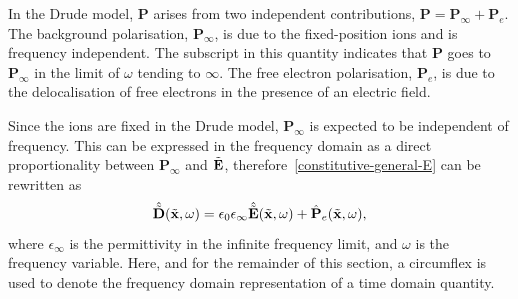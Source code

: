 In the Drude model, $\mathbf{P}$ arises from two independent contributions, $\mathbf{P} = \mathbf{P}_{\infty} + \mathbf{P}_e$. The background polarisation, $\mathbf{P}_{\infty}$, is due to the fixed-position ions and is frequency independent. The subscript in this quantity indicates that $\mathbf{P}$ goes to $\mathbf{P}_{\infty}$ in the limit of $\omega$ tending to $\infty$. The free electron polarisation, $\mathbf{P}_e$, is due to the delocalisation of free electrons in the presence of an electric field.

Since the ions are fixed in the Drude model, $\mathbf{P}_{\infty}$ is expected to be independent of frequency. This can be expressed in the frequency domain as a direct proportionality between $\mathbf{P}_{\infty}$ and $\tilde{\mathbf{E}}$, therefore~\eqref{constitutive-general-E} can be rewritten as
%
\begin{equation}
\label{eq:constitutive_equations_drude_model}
\hat{\tilde{\mathbf{D}}}(\tilde{\mathbf{x}},\omega) = \epsilon_0 \epsilon_{\infty}  \hat{\tilde{\mathbf{E}}}(\tilde{\mathbf{x}}, \omega) + \hat{\mathbf{P}}_e(\tilde{\mathbf{x}},\omega) ,
\end{equation}
%
where $\epsilon_{\infty}$ is the permittivity in the infinite frequency limit, and $\omega$ is the frequency variable. Here, and for the remainder of this section, a circumflex is used to denote the frequency domain representation of a time domain quantity.

